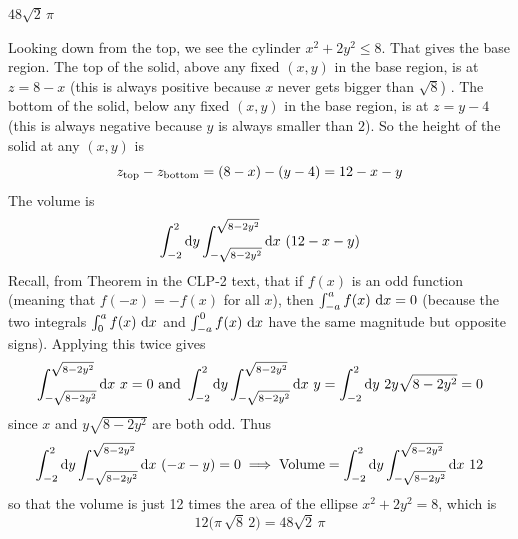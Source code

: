 %

\begin{answer}
$48\sqrt{2}\,\pi$
\end{answer}

\begin{solution}
Looking down from the top, we see the cylinder 
$x^2+2y^2\le 8$. That gives the base region. The top of the solid, above
any fixed $(x,y)$ in the base region, is at $z=8-x$ (this is always positive
because $x$ never gets bigger than $\sqrt{8}$) . The bottom 
of the solid, below any fixed $(x,y)$ in the base region, is at 
$z=y-4$ (this is always negative because $y$ is always smaller than $2$).
So the height of the solid at any $(x,y)$ is 
\begin{equation*}
z_{\rm top}-z_{\rm bottom}
=(8-x)-(y-4)=12-x-y
\end{equation*} 
The volume is
\begin{equation*}
\int_{-2}^{2}\dee{y}\int_{-\sqrt{8-2y^2}}^{\sqrt{8-2y^2}}\dee{x}\ (12-x-y)
\end{equation*}
Recall, from Theorem  in the CLP-2 text, 
that if $f(x)$ is an odd function (meaning that
$f(-x)=-f(x)$ for all $x$), then $\int_{-a}^a f(x)\ \mathrm{d}x=0$ (because the 
two integrals $\int_0^a f(x)\ \dee{x}$ and $\int_{-a}^0 f(x)\ \dee{x}$ have the 
same magnitude but opposite signs). Applying this twice gives
\begin{equation*}
\int_{-\sqrt{8-2y^2}}^{\sqrt{8-2y^2}}\dee{x}\ x=0\text{ and }
\int_{-2}^{2}\dee{y}\int_{-\sqrt{8-2y^2}}^{\sqrt{8-2y^2}}\dee{x}\ y
=\int_{-2}^{2}\dee{y}\ 2y\sqrt{8-2y^2}=0
\end{equation*}
since $x$ and $y\sqrt{8-2y^2}$ are both odd. Thus
\begin{equation*}
\int_{-2}^{2}\dee{y}\int_{-\sqrt{8-2y^2}}^{\sqrt{8-2y^2}}\dee{x}\ (-x-y)=0
\implies 
\text{Volume} = \int_{-2}^{2}\dee{y}\int_{-\sqrt{8-2y^2}}^{\sqrt{8-2y^2}}\dee{x}\ 
12
\end{equation*}
so that the volume is just 12 times the area of the ellipse $x^2+2y^2=8$,
which is
\begin{equation*}
12\big(\pi\,\sqrt{8}\,2\big)= 48\sqrt{2}\,\pi
\end{equation*}
\end{solution}